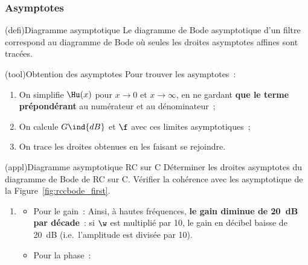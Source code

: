 \documentclass[../../main/main.tex]{subfiles}
\begin{document}
\subsubsection{Asymptotes}
\begin{tcb*}(defi){Diagramme asymptotique}
	Le diagramme de Bode asymptotique d'un filtre correspond au diagramme de Bode
	où seules les droites asymptotes affines sont tracées.
\end{tcb*}
\begin{tcb*}(tool){Obtention des asymptotes}
	Pour trouver les asymptotes~:
	\begin{enumerate}
		\item On simplifie $\Hu(x)$ pour $x\to 0$ et $x\to \infty$, en ne gardant
		      \textbf{que le terme prépondérant} au numérateur et au dénominateur~;
		\item On calcule $G\ind{dB}$ et $\f$ avec ces limites asymptotiques~;
		\item On trace les droites obtenues en les faisant se rejoindre.
	\end{enumerate}
\end{tcb*}
\begin{tcb*}(appl){Diagramme asymptotique RC sur C}
	Déterminer les droites asymptotes du diagramme de Bode de RC sur C. Vérifier
	la cohérence avec les asymptotique de la Figure~\ref{fig:rccbode_first}.
	\tcblower
	\vspace{12pt}
	\begin{enumerate}
		\mitem
		\psw{
			\[
				\boxed{
					\Hu(x) \opto{}{x\to 0} \frac{1}{1 + 0} = 1
					\qet
					\Hu(x) \opto{}{x\to \infty} \frac{1}{\jx}
				}
			\]
		}
		\vspace{-15pt}
		\item
		      \begin{itemize}
			      \item Pour le gain~:
			            \psw{
				            \[
					            G\ind{dB}(x) \opto{}{x\to 0} 20 \log (1) = 0
					            \qet
					            G\ind{dB}(x) \opto{}{x\to\infty} 20 \log \abs{\frac{1}{\jx}} = -20 \log
					            x
				            \]
			            }%
			            Ainsi, à hautes fréquences, \textbf{le gain diminue de
				            \SI{20}{dB} par décade}~: si $\w$ est multiplié par 10, le
			            gain en décibel baisse de \SI{20}{dB} (i.e.\ l'amplitude est
			            divisée par 10).
			      \item Pour la phase~:
			            \psw{
				            \[
					            \f(x) \opto{}{x\to 0} \arg*{1} = 0
					            \qet
					            \f(x) \opto{}{x\to \infty} \arg*{\frac{1}{\jx}} = -\frac{\pi}{2}
				            \]
			            }
			            \vspace{-15pt}
		      \end{itemize}
	\end{enumerate}
\end{tcb*}
\end{document}
